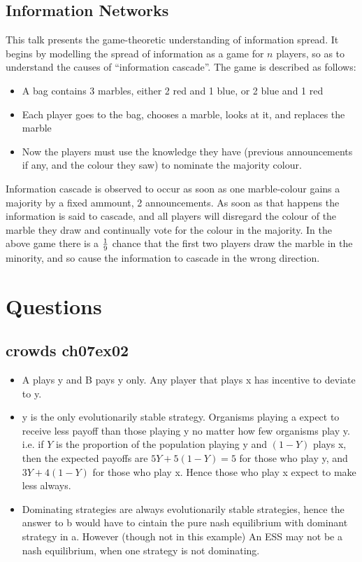 \documentclass{article}
\begin{document}
\subsection{Information Networks}

This talk presents the game-theoretic understanding of information spread.
It begins by modelling the spread of information as a game for $n$ players, so as to understand the causes of ``information cascade''.
The game is described as follows:
\begin{itemize}
	\item A bag contains 3 marbles, either 2 red and 1 blue, or 2 blue and 1 red
	\item Each player goes to the bag, chooses a marble, looks at it, and replaces the marble
	\item Now the players must use the knowledge they have (previous announcements if any, and the colour they saw) to nominate the majority colour.
\end{itemize}

Information cascade is observed to occur as soon as one marble-colour gains a majority by a fixed ammount, 2 announcements.
As soon as that happens the information is said to cascade, and all players will disregard the colour of the marble they draw and continually vote for the colour in the majority.
In the above game there is a $1 \over 9$ chance that the first two players draw the marble in the minority, and so cause the information to cascade in the wrong direction.

\newpage

\section{Questions}

\subsection{crowds ch07ex02}
\begin{itemize}
	\item A plays y and B pays y only. Any player that plays x has incentive to deviate to y.
	\item y is the only evolutionarily stable strategy. Organisms playing a expect to receive less payoff than those playing y no matter how few organisms play y.
			i.e. if $Y$ is the proportion of the population playing y and $(1-Y)$ plays x, then the expected payoffs are $5Y + 5(1-Y) = 5$ for those who play y, and $3Y + 4(1-Y)$ for those who play x.
			Hence those who play x expect to make less always.
	\item Dominating strategies are always evolutionarily stable strategies, hence the answer to b would have to cintain the pure nash equilibrium with dominant strategy in a.
			However (though not in this example) An ESS may not be a nash equilibrium, when one strategy is not dominating.
\end{itemize}
\end{document}
